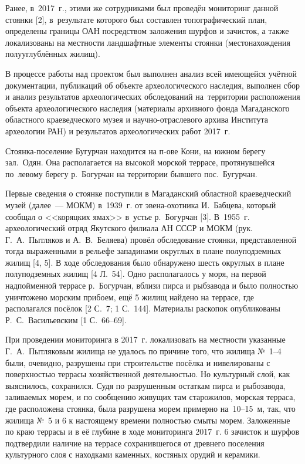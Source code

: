 Ранее, в~2017~г., этими же сотрудниками был проведён мониторинг данной стоянки [2], в~результате которого был составлен топографический план, определены границы ОАН посредством заложения шурфов и зачисток, а также локализованы на местности ландшафтные элементы стоянки (местонахождения полууглублённых жилищ).

В процессе работы над проектом был выполнен анализ всей имеющейся учётной документации, публикаций об объекте археологического наследия, выполнен сбор и анализ результатов археологических обследований на~территории расположения объекта археологического наследия (материалы архивного фонда Магаданского областного краеведческого музея и научно-отраслевого архива Института археологии РАН) и результатов археологических работ 2017~г.

Стоянка-поселение Бугурчан находится на п-ове Кони, на южном берегу зал.~Одян. Она располагается на высокой морской террасе, протянувшейся по~левому берегу р.~Богурчан на территории бывшего пос.~Бугурчан.

Первые сведения о стоянке поступили в Магаданский областной краеведческий музей (далее~--- МОКМ) в~1939~г. от эвена-охотника И.~Бабцева, который сообщал о <<коряцких ямах>> в~устье р.~Богурчан [3]. В~1955~г. археологический отряд Якутского филиала АН СССР и МОКМ (рук. Г.~А.~Пытляков и А.~В.~Беляева) провёл обследование стоянки, представленной тогда выраженными в рельефе западинами округлых в пла­не полуподземных жилищ [4, 5]. В ходе обследования было обнаружено шесть округлых в плане полуподземных жилищ [4 Л.~54]. Одно располагалось у моря, на первой надпойменной террасе р.~Богурчан, вблизи пирса и рыбзавода и было полностью уничтожено морским прибоем, ещё 5 жилищ найдено на террасе, где располагался посёлок [2 С.~7; 1 С.~144]. Материалы раскопок опубликованы Р.~С.~Васильевским [1 С.~66--69].

При проведении мониторинга в 2017~г. локализовать на местности указанные Г.~А.~Пытляковым жилища не удалось по причине того, что жилища №~1--4 были, очевидно, разрушены при строительстве посёлка и нивелированы с поверхностью террасы хозяйственной деятельностью. Но культурный слой, как выяснилось, сохранился. Судя по разрушенным остаткам пирса и рыбозавода, заливаемых морем, и по сообщению живущих там старожилов, морская терраса, где расположена стоянка, была разрушена морем примерно на~10--15~м, так, что жилища №~5 и 6 к настоящему времени полностью смыты морем.
Заложенные по краю террасы и в её глубине в ходе мониторинга 2017~г. 6 зачисток и шурфов подтвердили наличие на террасе сохранившегося от древнего поселения культурного слоя с находками каменных, костяных орудий и керамики.

